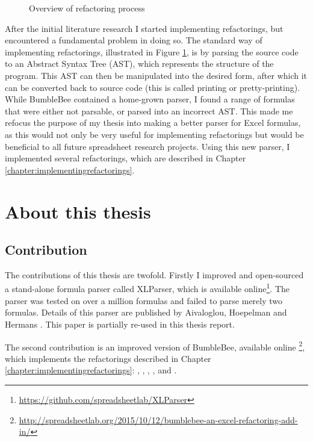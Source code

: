 \begin{figure}
\centerfloat

\caption{Overview of refactoring process}
\label{fig:refactoring-process}
\end{figure}

After the initial literature research I started implementing refactorings, but encountered a fundamental problem in doing so.
The standard way of implementing refactorings, illustrated in Figure \ref{fig:refactoring-process}, is by parsing the source code to an Abstract Syntax Tree (AST), which represents the structure of the program.
This AST can then be manipulated into the desired form, after which it can be converted back to source code (this is called printing or pretty-printing).
While BumbleBee contained a home-grown parser, I found a range of formulas that were either not parsable, or parsed into an incorrect AST.
This made me refocus the purpose of my thesis into making a better parser for Excel formulas, as this would not only be very useful for implementing refactorings but would be beneficial to all future spreadsheet research projects.
Using this new parser, I implemented several refactorings, which are described in Chapter \ref{chapter:implementingrefactorings}.

\section{About this thesis}

\subsection{Contribution}

The contributions of this thesis are twofold.
Firstly I improved and open-sourced a stand-alone formula parser called XLParser, which is available online\footnote{\url{https://github.com/spreadsheetlab/XLParser}}.
The parser was tested on over a million formulas and failed to parse merely two formulas.
Details of this parser are published by Aivaloglou, Hoepelman and Hermans \cite{xlparser}.
This paper is partially re-used in this thesis report.

The second contribution is an improved version of BumbleBee, available online \footnote{\url{http://spreadsheetlab.org/2015/10/12/bumblebee-an-excel-refactoring-add-in/}}, which implements the refactorings described in Chapter \ref{chapter:implementingrefactorings}: , , , ,  and .


